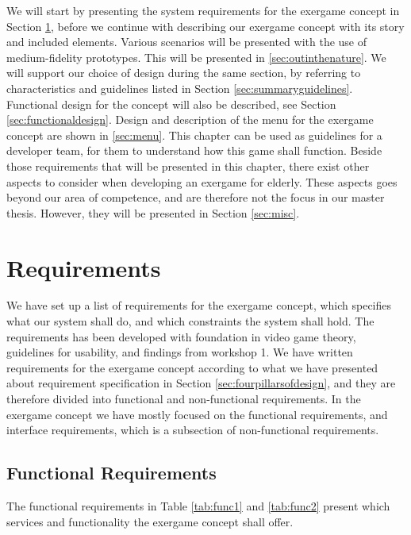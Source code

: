 We will start by presenting the system requirements for the exergame concept in Section \ref{sec:req}, before we continue with describing our exergame concept with its story and included elements. Various scenarios will be presented with the use of medium-fidelity prototypes. This will be presented in \ref{sec:outinthenature}. We will support our choice of design during the same section, by referring to characteristics and guidelines listed in Section \ref{sec:summaryguidelines}. Functional design for the concept will also be described, see Section \ref{sec:functionaldesign}. Design and description of the menu for the exergame concept are shown in \ref{sec:menu}. This chapter can be used as guidelines for a developer team, for them to understand how this game shall function. Beside those requirements that will be presented in this chapter, there exist other aspects to consider when developing an exergame for elderly. These aspects goes beyond our area of competence, and are therefore not the focus in our master thesis. However, they will be presented in Section \ref{sec:misc}.

\section{Requirements}
\label{sec:req}
We have set up a list of requirements for the exergame concept, which specifies what our system shall do, and which constraints the system shall hold. The requirements has been developed with foundation in video game theory, guidelines for usability, and findings from workshop 1. We have written requirements for the exergame concept according to what we have presented about requirement specification in Section \ref{sec:fourpillarsofdesign}, and they are therefore divided into functional and non-functional requirements. In the exergame concept we have mostly focused on the functional requirements, and interface requirements, which is a subsection of non-functional requirements. 

\subsection{Functional Requirements}
The functional requirements in Table \ref{tab:func1} and \ref{tab:func2} present which services and functionality the exergame concept shall offer.

